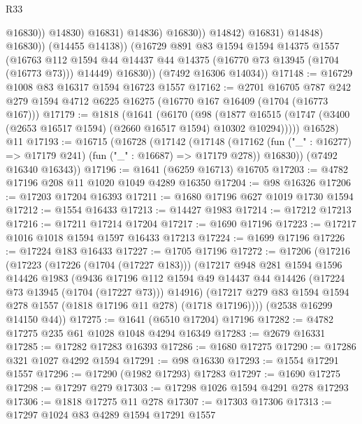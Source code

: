 \begin{lexlean}{R33}
\begin{coremodule}
                                  @16830))
                              @14830)
                            @16831)
                          @14836)
                        @16830))
                    @14842)
                  @16831)
                @14848)
              @16830))
          (@14455 @14138))
        (@16729
          @891
          @83
          @1594
          @1594
          @14375
          @1557
          (@16763 @112 @1594 @44 @14437 @44 @14375 (@16770 @73 @13945 (@1704 (@16773 @73))) @14449)
          @16830))
      (@7492 @16306 @14034))
@17148 := @16729 @1008 @83 @16317 @1594 @16723 @1557
@17162 := @2701
    @16705
    @787
    @242
    @279
    @1594
    @4712
    @6225
    @16275
    (@16770 @167 @16409 (@1704 (@16773 @167)))
@17179 := @1818
    (@1641
      (@6170
        (@98
          (@1877 @16515 (@1747 (@3400 (@2653 @16517 @1594) (@2660 @16517 @1594) @10302 @10294)))))
      @16528)
    @11
@17193 := @16715
    (@16728
      (@17142
        (@17148
          (@17162 (fun ("_" : @16277) => @17179 @241) (fun ("_" : @16687) => @17179 @278))
          @16830))
      (@7492 @16340 @16343))
@17196 := @1641 (@6259 @16713) @16705
@17203 := @4782 @17196 @208 @11 @1020 @1049 @4289 @16350
@17204 := @98 @16326
@17206 := @17203 @17204 @16393
@17211 := @1680 @17196 @627 @1019 @1730 @1594
@17212 := @1554 @16433
@17213 := @14427 @1983
@17214 := @17212 @17213
@17216 := @17211 @17214 @17204
@17217 := @1690 @17196
@17223 := @17217 @1016 @1018 @1594 @1597 @16433 @17213
@17224 := @1699 @17196
@17226 := @17224 @183 @16433
@17227 := @1705 @17196
@17272 := @17206
    (@17216
      (@17223
        (@17226 (@1704 (@17227 @183)))
        (@17217
          @948
          @281
          @1594
          @1596
          @14426
          @1983
          (@9436
            @17196
            @112
            @1594
            @49
            @14437
            @44
            @14426
            (@17224 @73 @13945 (@1704 (@17227 @73)))
            @14916)
          (@17217 @279 @83 @1594 @1594 @278 @1557 (@1818 @17196 @11 @278) (@1718 @17196))))
      (@2538 @16299 @14150 @44))
@17275 := @1641 (@6510 @17204) @17196
@17282 := @4782 @17275 @235 @61 @1028 @1048 @4294 @16349
@17283 := @2679 @16331
@17285 := @17282 @17283 @16393
@17286 := @1680 @17275
@17290 := @17286 @321 @1027 @4292 @1594
@17291 := @98 @16330
@17293 := @1554 @17291 @1557
@17296 := @17290 (@1982 @17293) @17283
@17297 := @1690 @17275
@17298 := @17297 @279
@17303 := @17298 @1026 @1594 @4291 @278 @17293
@17306 := @1818 @17275 @11 @278
@17307 := @17303 @17306
@17313 := @17297 @1024 @83 @4289 @1594 @17291 @1557

\end{coremodule}
\end{lexlean}
